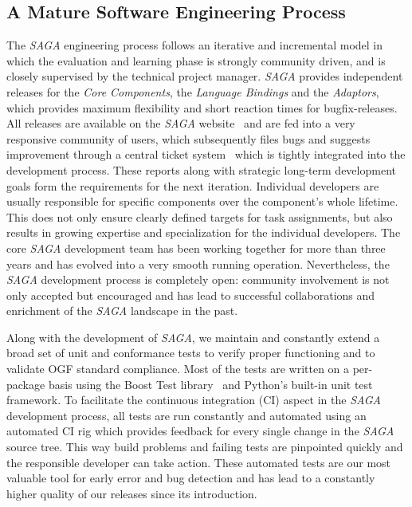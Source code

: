 \documentclass[a4paper,10pt]{article}
\newcommand{\I}[1]{\textit{#1}}
\newcommand{\sagaimpl}{\textit{SAGA}\xspace}
\newcommand{\impl}{\sagaimpl}
\begin{document}
\vspace{-0.8em}


\subsection*{A Mature Software Engineering Process\label{engineering}}
\vspace{-0.5em}

 The \impl engineering process follows an iterative and incremental
 model in which the evaluation and learning phase is strongly
 community driven, and is closely supervised by the technical project
 manager.  \impl provides independent releases for the \I{Core
 Components}, the \I{Language Bindings} and the \I{Adaptors}, which
 provides maximum flexibility and short reaction times for
 bugfix-releases. All releases are available on the \impl
 website~\cite{saga_downloads_web} and are fed into a very responsive
 community of users, which subsequently files bugs and suggests
 improvement through a central ticket
 system~\cite{saga_bugtracking_web} which is tightly integrated into
 the development process. These reports along with strategic long-term
 development goals form the requirements for the next iteration.
 Individual developers are usually responsible for specific components
 over the component's whole lifetime. This does not only ensure
 clearly defined targets for task assignments, but also results in
 growing expertise and specialization for the individual developers.
 The core \impl development team has been working together for more
 than three years and has evolved into a very smooth running
 operation.  Nevertheless, the \impl development process is completely
 open: community involvement is not only accepted but encouraged and
 has lead to successful collaborations and enrichment of the \impl
 landscape in the past.

 Along with the development of \impl, we maintain and constantly
 extend a broad set of unit and conformance tests to verify proper
 functioning and to validate OGF standard compliance. Most of the
 tests are written on a per-package basis using the Boost Test
 library~\cite{boost_test_web} and Python's built-in unit test
 framework. To facilitate the continuous integration (CI) aspect in
 the \impl development process, all tests are run constantly and
 automated using an automated CI rig\cite{buildbot_web} which provides
 feedback for every single change in the \impl source tree. This way
 build problems and failing tests are pinpointed quickly and the
 responsible developer can take action. These automated tests are  our
 most valuable tool for early error and bug detection and has lead to
 a constantly higher quality of our releases since its introduction.
\end{document}

